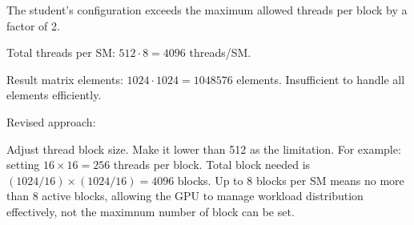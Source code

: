 \documentclass{article}
\begin{document}
The student's configuration exceeds the maximum allowed threads per block by a factor of 2.

Total threads per SM: \(512\cdot8=4096\) threads/SM.

Result matrix elements: \(1024\cdot1024=1048576\) elements. Insufficient to handle all elements efficiently.

Revised approach:

Adjust thread block size. Make it lower than 512 as the limitation. For example: setting \(16\times16=256\) threads per block. Total block needed is \((1024/16)\times(1024/16)=4096\) blocks. Up to 8 blocks per SM means no more than 8 active blocks, allowing the GPU to manage workload distribution effectively, not the maximnum number of block can be set.
\end{document}
